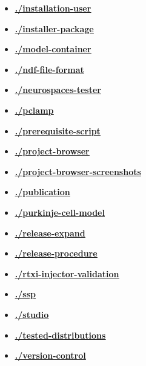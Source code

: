 \documentclass[12pt]{article}
\begin{document}
\begin{itemize}
\item \href{.././installation-user/./installation-user.pdf}{\bf \underline{./installation-user}}

\item \href{.././installer-package/./installer-package.pdf}{\bf \underline{./installer-package}}

\item \href{.././model-container/./model-container.pdf}{\bf \underline{./model-container}}

\item \href{.././ndf-file-format/./ndf-file-format.pdf}{\bf \underline{./ndf-file-format}}

\item \href{.././neurospaces-tester/./neurospaces-tester.pdf}{\bf \underline{./neurospaces-tester}}

\item \href{.././pclamp/./pclamp.pdf}{\bf \underline{./pclamp}}

\item \href{.././prerequisite-script/./prerequisite-script.pdf}{\bf \underline{./prerequisite-script}}

\item \href{.././project-browser/./project-browser.pdf}{\bf \underline{./project-browser}}

\item \href{.././project-browser-screenshots/./project-browser-screenshots.pdf}{\bf \underline{./project-browser-screenshots}}

\item \href{.././publication/./publication.pdf}{\bf \underline{./publication}}

\item \href{.././purkinje-cell-model/./purkinje-cell-model.pdf}{\bf \underline{./purkinje-cell-model}}

\item \href{.././release-expand/./release-expand.pdf}{\bf \underline{./release-expand}}

\item \href{.././release-procedure/./release-procedure.pdf}{\bf \underline{./release-procedure}}

\item \href{.././rtxi-injector-validation/./rtxi-injector-validation.pdf}{\bf \underline{./rtxi-injector-validation}}

\item \href{.././ssp/./ssp.pdf}{\bf \underline{./ssp}}

\item \href{.././studio/./studio.pdf}{\bf \underline{./studio}}

\item \href{.././tested-distributions/./tested-distributions.pdf}{\bf \underline{./tested-distributions}}

\item \href{.././version-control/./version-control.pdf}{\bf \underline{./version-control}}


\end{itemize}

\end{document}
